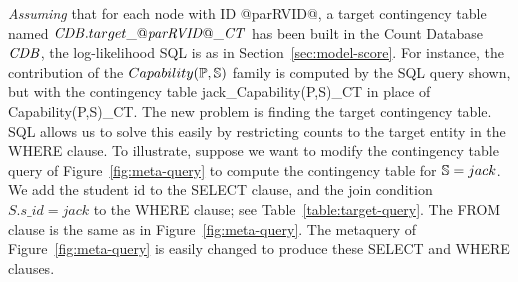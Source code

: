 {\em Assuming} that for each node with ID @parRVID@, a target contingency table named $\CDB.target\_@\it{parRVID}@\_\cttable$ has been built in the Count Database $\CDB$, the log-likelihood SQL is as in Section~\ref{sec:model-score}. For instance, the contribution of the $Capability(\P,\S)$ family is computed by the SQL query shown,  but with the contingency table jack\_Capability(P,S)\_CT in place of Capability(P,S)\_CT.
%
The new problem is finding the target contingency table. SQL allows us to solve this easily by restricting counts to the target entity in the WHERE clause. To illustrate, suppose we want to modify the contingency table query of Figure~\ref{fig:meta-query} to compute the contingency table for $\S = jack$. We add the student id to the SELECT clause, and the join condition $S.s\_id = jack$ to the WHERE clause; see Table~\ref{table:target-query}. %
The FROM clause is the same as in Figure~\ref{fig:meta-query}. The metaquery of Figure~\ref{fig:meta-query} is easily changed to produce these SELECT and WHERE clauses.


%
%
%

